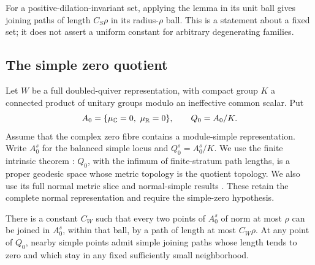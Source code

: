 For a positive-dilation-invariant set, applying the lemma in its
unit ball gives joining paths of length \(C_S\rho\) in its
radius-\(\rho\) ball. This is a statement about a fixed set; it
does not assert a uniform constant for arbitrary degenerating
families.

\subsection{The simple zero quotient}
Let \(W\) be a full doubled-quiver representation, with compact
group \(K\) a connected product of unitary groups modulo an
ineffective common scalar. Put
\[
 A_0=\{\mu_{\C}=0,\ \mu_{\R}=0\},\qquad Q_0=A_0/K.
\]
Assume that the complex zero fibre contains a module-simple
representation. Write \(A_0^s\) for the balanced simple locus and
\(Q_0^s=A_0^s/K\).
We use the finite intrinsic theorem
\cite[Section~5]{wuebben14}: \(Q_0\), with the infimum of
finite-stratum path lengths, is a proper geodesic space whose
metric topology is the quotient topology. We also use its full
normal metric slice and normal-simple results
\cite[Sections~4,6]{wuebben14}. These retain the complete normal
representation and require the simple-zero hypothesis.

\begin{lemma}\label{lem:simple-paths}
There is a constant \(C_W\) such that every two points of
\(A_0^s\) of norm at most \(\rho\) can be joined in \(A_0^s\),
within that ball, by a path of length at most \(C_W\rho\).
At any point of \(Q_0\), nearby simple points admit simple joining
paths whose length tends to zero and which stay in any fixed
sufficiently small neighborhood.
\end{lemma}


